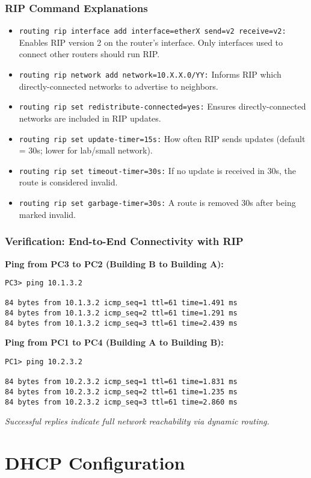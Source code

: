 \documentclass{beamer}
\begin{document}
\begin{frame}[fragile]
\frametitle{RIP Command Explanations}
\begin{itemize}
    \item \texttt{routing rip interface add interface=etherX send=v2 receive=v2:} Enables RIP version 2 on the router’s interface. Only interfaces used to connect other routers should run RIP.
    \item \texttt{routing rip network add network=10.X.X.0/YY:} Informs RIP which directly-connected networks to advertise to neighbors.
    \item \texttt{routing rip set redistribute-connected=yes:} Ensures directly-connected networks are included in RIP updates.
    \item \texttt{routing rip set update-timer=15s:} How often RIP sends updates (default = 30s; lower for lab/small network).
    \item \texttt{routing rip set timeout-timer=30s:} If no update is received in 30s, the route is considered invalid.
    \item \texttt{routing rip set garbage-timer=30s:} A route is removed 30s after being marked invalid.
\end{itemize}
\end{frame}

\begin{frame}[fragile]
\frametitle{Verification: End-to-End Connectivity with RIP}
\textbf{Ping from PC3 to PC2 (Building B to Building A):}
\begin{lstlisting}
PC3> ping 10.1.3.2

84 bytes from 10.1.3.2 icmp_seq=1 ttl=61 time=1.491 ms
84 bytes from 10.1.3.2 icmp_seq=2 ttl=61 time=1.291 ms
84 bytes from 10.1.3.2 icmp_seq=3 ttl=61 time=2.439 ms
\end{lstlisting}
\textbf{Ping from PC1 to PC4 (Building A to Building B):}
\begin{lstlisting}
PC1> ping 10.2.3.2

84 bytes from 10.2.3.2 icmp_seq=1 ttl=61 time=1.831 ms
84 bytes from 10.2.3.2 icmp_seq=2 ttl=61 time=1.235 ms
84 bytes from 10.2.3.2 icmp_seq=3 ttl=61 time=2.860 ms
\end{lstlisting}
\textit{Successful replies indicate full network reachability via dynamic routing.}
\end{frame}

\section{DHCP Configuration}
\end{document}
